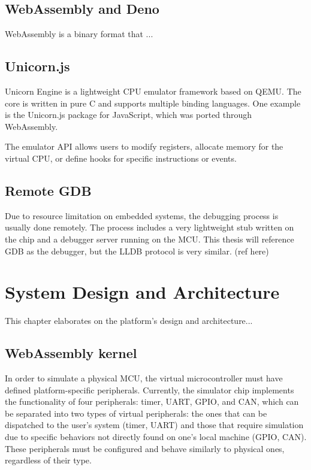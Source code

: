 \documentclass[12pt,a4paper]{report}
\begin{document}
\section{WebAssembly and Deno}

WebAssembly is a binary format that ...

\section{Unicorn.js}

Unicorn Engine is a lightweight CPU emulator framework based on QEMU. The core is written in pure C and supports multiple binding languages. One example is the Unicorn.js package for JavaScript, which was ported through WebAssembly.

The emulator API allows users to modify registers, allocate memory for the virtual CPU, or define hooks for specific instructions or events.

\section{Remote GDB}

Due to resource limitation on embedded systems, the debugging process is usually done remotely. The process includes a very lightweight stub written on the chip and a debugger server running on the MCU. This thesis will reference GDB as the debugger,
but the LLDB protocol is very similar. (ref here)


\chapter{System Design and Architecture}

This chapter elaborates on the platform's design and architecture...

\section{WebAssembly kernel}

In order to simulate a physical MCU, the virtual microcontroller must have defined platform-specific peripherals. Currently, the simulator chip implements the functionality of four peripherals: timer, UART, GPIO, and CAN, which can be separated into two types of virtual peripherals:
the ones that can be dispatched to the user's system (timer, UART) and those that require simulation due to specific behaviors not directly found on one's local machine (GPIO, CAN). These peripherals must be configured and behave similarly to physical ones, regardless of their type.
\end{document}
